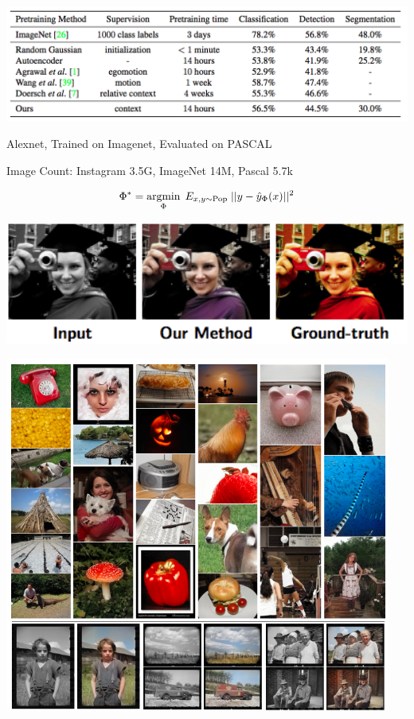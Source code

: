 {

\centerline{\includegraphics[width = 9in]{../images/LearnRepINpb}}
\centerline{Alexnet, Trained on Imagenet, Evaluated on PASCAL}
\centerline{Image Count: {\color{red} Instagram 3.5G, ImageNet 14M, Pascal 5.7k}}


{\color{red} $$\Phi^* = \operatorname*{argmin}_\Phi \;E_{x,y \sim \mathrm{Pop}}\; ||y - \hat{y}_\Phi(x)||^2$$}

\vfill
\centerline{\includegraphics[width = 6in]{../images/colorizationGreg2}}


\centerline{\includegraphics[width = 5in]{../images/LearnRepColorb}}

}
